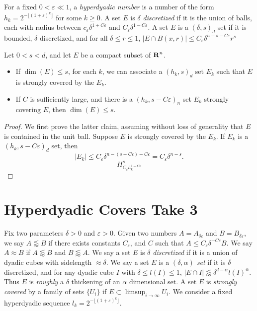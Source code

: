 For a fixed $0 < \varepsilon \ll 1$, a \emph{hyperdyadic number} is a number of the form $h_k = 2^{-\lfloor (1 + \varepsilon)^k \rfloor}$ for some $k \geq 0$. A set $E$ is \emph{$\delta$ discretized} if it is the union of balls, each with radius between $c_\varepsilon \delta^{1 + C\varepsilon}$ and $C_\varepsilon \delta^{1-C\varepsilon}$. A set $E$ is a $(\delta,s)_d$ set if it is bounded, $\delta$ discretized, and for all $\delta \leq r \leq 1$, $|E \cap B(x,r)| \leq C_\varepsilon \delta^{n-s-C\varepsilon} r^s$

\begin{lemma}
	Let $0 < s < d$, and let $E$ be a compact subset of $\operatorname{\mathbf{R}}^n$.
	\begin{itemize}
		\item If $\dim(E) \leq s$, for each $k$, we can associate a $(h_k,s)_d$ set $E_k$ such that $E$ is strongly covered by the $E_k$.

		\item If $C$ is sufficiently large, and there is a $(h_k, s - C\varepsilon)_n$ set $E_k$ strongly covering $E$, then $\dim(E) \leq s$.
	\end{itemize}
\end{lemma}
\begin{proof}
	We first prove the latter claim, assuming without loss of generality that $E$ is contained in the unit ball. Suppose $E$ is strongly covered by the $E_k$. If $E_k$ is a $(h_k,s - C\varepsilon)_d$ set, then
	\[ |E_k| \leq C_\varepsilon \delta^{n-(s-C\varepsilon)-C\varepsilon} = C_\varepsilon \delta^{n-s}. \]
	\[ H^s_{C_\varepsilon h_k^{1 - C\varepsilon}} \]
\end{proof}










\section{Hyperdyadic Covers Take 3}

Fix two parameters $\delta > 0$ and $\varepsilon > 0$. Given two numbers $A = A_{\delta \varepsilon}$ and $B = B_{\delta \varepsilon}$, we say $A \lessapprox B$ if there exists constants $C_\varepsilon$, and $C$ such that $A \leq C_\varepsilon \delta^{-C\varepsilon} B$. We say $A \approx B$ if $A \lessapprox B$ and $B \lessapprox A$. We say a set $E$ is \emph{$\delta$ discretized} if it is a union of dyadic cubes with sidelength $\approx \delta$. We say a set $E$ is a \emph{$(\delta,\alpha)$ set} if it is $\delta$ discretized, and for any dyadic cube $I$ with $\delta \leq l(I) \leq 1$, $|E \cap I| \lessapprox \delta^{d-\alpha} l(I)^\alpha$. Thus $E$ is \emph{roughly} a $\delta$ thickening of an $\alpha$ dimensional set. A set $E$ is \emph{strongly covered} by a family of sets $\{ U_i \}$ if $E \subset \limsup_{i \to \infty} U_i$. We consider a fixed hyperdyadic sequence $l_k = 2^{- \lfloor (1 + \varepsilon)^k \rfloor}$.

